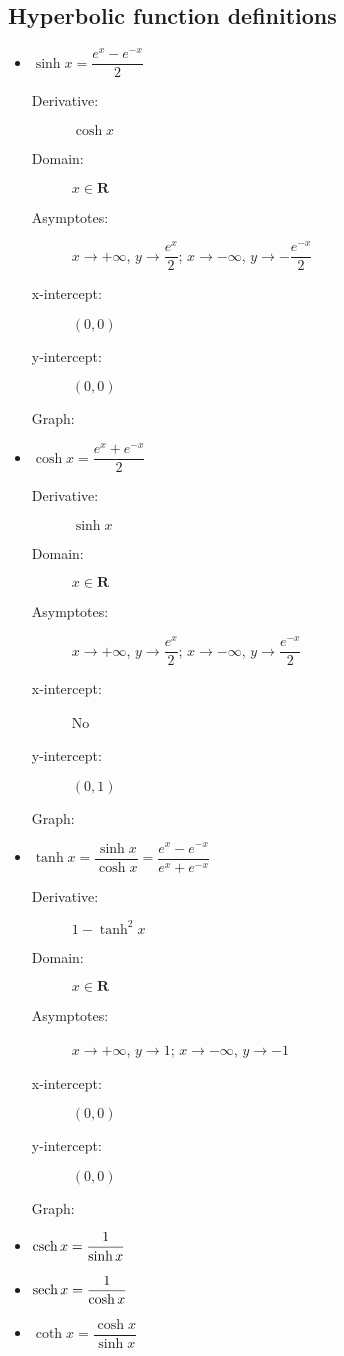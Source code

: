 \subsection{Hyperbolic function definitions}
\begin{itemize}
	\item $\sinh x = \dfrac{e^x-e^{-x}}{2}$
	\begin{description}
		\item[Derivative:] $\cosh x$
		\item[Domain:] $x \in \textbf{R}$
		\item[Asymptotes:] $x\rightarrow +\infty$, $y\rightarrow\dfrac{e^x}{2}$; $x\rightarrow -\infty$, $y\rightarrow -\dfrac{e^{-x}}{2}$
		\item[x-intercept:] $(0,0)$
		\item[y-intercept:] $(0,0)$
		\item[Graph:]
	\end{description}
	\item $\cosh x = \dfrac{e^x+e^{-x}}{2}$
	\begin{description}
		\item[Derivative:] $\sinh x$
		\item[Domain:] $x \in \textbf{R}$
		\item[Asymptotes:] $x\rightarrow +\infty$, $y\rightarrow\dfrac{e^x}{2}$; $x\rightarrow -\infty$, $y\rightarrow\dfrac{e^{-x}}{2}$
		\item[x-intercept:] No
		\item[y-intercept:] $(0,1)$
		\item[Graph:]
	\end{description}
	\item $\tanh x = \dfrac{\sinh x}{\cosh x}=\dfrac{e^x-e^{-x}}{e^x+e^{-x}}$
	\begin{description}
		\item[Derivative:] $1-\tanh^2 x$
		\item[Domain:] $x \in \textbf{R}$
		\item[Asymptotes:] $x\rightarrow +\infty$, $y\rightarrow 1$; $x\rightarrow -\infty$, $y\rightarrow -1$
		\item[x-intercept:] $(0,0)$
		\item[y-intercept:] $(0,0)$
		\item[Graph:]
	\end{description}
	\item $\operatorname{csch} x = \dfrac{1}{\sinh x}$
	\item $\operatorname{sech} x = \dfrac{1}{\cosh x}$
	\item $\coth x = \dfrac{\cosh x}{\sinh x}$
\end{itemize}

